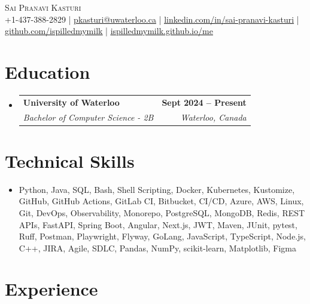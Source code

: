 \documentclass[letterpaper,10pt]{article}
\makeatletter
\newcommand{\resumeSubheading}[4]{
  \vspace{-1pt}\item
    \begin{tabular*}{1.0\textwidth}[t]{l@{\extracolsep{\fill}}r}
      \textbf{#1} & \textbf{\small #2} \\
      \textit{\small#3} & \textit{\small #4} \\[-2pt]
    \end{tabular*}\vspace{-7pt}
}
\newcommand{\resumeSubHeadingListStart}{\begin{itemize}[leftmargin=0.0in, label={}]}
\newcommand{\resumeSubHeadingListEnd}{\end{itemize}}
\makeatother
\begin{document}

\vspace{-28pt}
\begin{center}
    {\Huge \scshape Sai Pranavi Kasturi} \\ 
    
    \small +1-437-388-2829 | \underline{pkasturi@uwaterloo.ca} | \href{https://linkedin.com/in/sai-pranavi-kasturi-704807298}{\underline{linkedin.com/in/sai-pranavi-kasturi}} | \href{https://github.com/ispilledmymilk}{\underline{github.com/ispilledmymilk}} | \href{https://ispilledmymilk.github.io/me/}{\underline{ispilledmymilk.github.io/me}}
    \vspace{-10pt}
\end{center}

\vspace{-10pt}
\section{Education}
  \resumeSubHeadingListStart
    \resumeSubheading
      {University of Waterloo}{Sept 2024 -- Present}
      {Bachelor of Computer Science - 2B}{Waterloo, Canada}
  \resumeSubHeadingListEnd
\vspace{-8pt}
  

\section{Technical Skills}
\begin{itemize}[leftmargin=0.05in, label={}]
  \small\item{
    Python, Java, SQL, Bash, Shell Scripting, Docker, Kubernetes, Kustomize, GitHub, GitHub Actions, GitLab CI, Bitbucket, CI/CD, Azure, AWS, Linux, Git, DevOps, Observability, Monorepo, PostgreSQL, MongoDB, Redis, REST APIs, FastAPI, Spring Boot, Angular, Next.js, JWT, Maven, JUnit, pytest, Ruff, Postman, Playwright, Flyway, GoLang, JavaScript, TypeScript, Node.js, C++, JIRA, Agile, SDLC, Pandas, NumPy, scikit-learn, Matplotlib, Figma
  }
\end{itemize}
 \vspace{-18pt}

\vspace{1.20pt}
\section{Experience}
\end{document}
